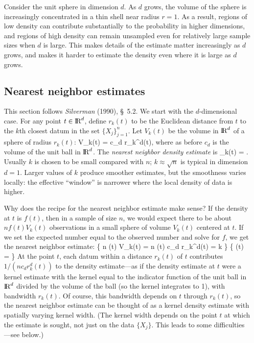 Consider the unit sphere in dimension $d$.
As $d$ grows, the volume of the sphere is increasingly concentrated in
a thin shell near radius $r=1$.
As a result, regions of low density can contribute substantially to the
probability in higher dimensions, and regions of high density can
remain unsampled even for relatively large sample sizes when $d$ is large.
This makes details of the estimate matter increasingly as $d$ grows, and
makes it harder to estimate the density even where it is large as $d$ grows.

\subsection{Nearest neighbor estimates}
This section follows {\em Silverman\/} (1990), \S~5.2.
We start with the $d$-dimensional case.
For any point $t \in \hbox{I\kern-.17em\hbox{R}}^d$, define $r_k(t)$ to be the
Euclidean distance from $t$ to the $k$th closest datum in
the set $\{X_j\}_{j=1}^n$.
Let $V_k(t)$ be the volume in $\hbox{I\kern-.17em\hbox{R}}^d$ of a sphere of radius $r_k(t)$:
\beq
    V_k(t) = c_d r_k^d(t),
\eeq
where as before $c_d$ is the volume of the unit ball in $\hbox{I\kern-.17em\hbox{R}}^d$.
The {\em nearest neighbor density estimate\/} is
\beq
    _k(t) \equiv {} = .
\eeq
Usually $k$ is chosen to be small compared with $n$; $k \approx \sqrt{n}$
is typical in dimension $d=1$.
Larger values of $k$ produce smoother estimates, but the smoothness
varies locally: the effective ``window'' is narrower where the local density
of data is higher.

Why does the recipe for the nearest neighbor estimate make sense?
If the density at $t$ is $f(t)$, then in a sample of size $n$, we would
expect there to be about $n f(t) V_k(t)$ observations
in a small sphere of volume $V_k(t)$ centered at $t$.
If we set the expected number equal to the observed number and solve for
$f$, we get the nearest neighbor estimate:
\beq
    \left \{ n (t) V_k(t) = n (t) c_d r_k^d(t) = k \right \} \Rightarrow
    \left \{ (t) =  \right \}
\eeq
At the point $t$, each datum within a distance $r_k(t)$ of $t$ contributes
$1/(n c_d r_k^d(t))$ to the density estimate---as if the density estimate
at $t$ were a kernel estimate with the kernel equal to the indicator function
of the unit ball in $\hbox{I\kern-.17em\hbox{R}}^d$ divided by the volume of the ball
(so the kernel integrates to 1), with bandwidth $r_k(t)$.
Of course, this bandwidth depends on $t$ through $r_k(t)$,
so the nearest neighbor estimate can be thought of as a kernel density
estimate with spatially varying kernel width.
(The kernel width depends on the point $t$ at which the estimate is
sought, not just on the data $\{X_j\}$.
This leads to some difficulties---see below.)

